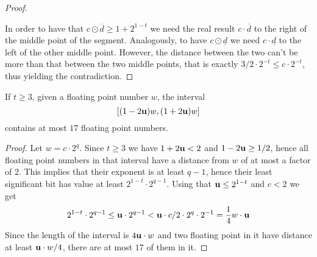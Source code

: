 \begin{proof}
\begin{center}
	\end{center}
	In order to have that $c \odot \overline{d} \ge 1 + 2^{1-t}$ we need the real result $c \cdot \overline{d}$ to the right of the middle point of the segment. Analogously, to have $c \odot \underline{d}$ we need $c \cdot \underline{d}$ to the left of the other middle point. However, the distance between the two can't be more than that between the two middle points, that is exactly $3/2 \cdot 2^{-t} \le c \cdot 2^{-t}$, thus yielding the contradiction.
\end{proof}

\begin{prop}\label{appA:th:interval-number-elem}
	If $t \ge 3$, given a floating point number $w$, the interval
	\[
	\left[ (1 - 2 \textbf{u}) w, (1 + 2 \textbf{u}) w \right]
	\]
	contains at most $17$ floating point numbers.
\end{prop}
\begin{proof}
	Let $w = c \cdot 2^q$. Since $t \ge 3$ we have $1 + 2 \textbf{u} < 2$ and $1 - 2 \textbf{u} \ge 1/2$, hence all floating point numbers in that interval have a distance from $w$ of at most a factor of $2$. This implies that their exponent is at least $q - 1$, hence their least significant bit has value at least $2^{1-t} \cdot 2^{q-1}$. Using that $\textbf{u} \le 2^{1-t}$ and $c < 2$ we get
	\[
	2^{1-t} \cdot 2^{q-1} \le \textbf{u} \cdot 2^{q-1} < \textbf{u} \cdot c / 2 \cdot 2^{q} \cdot 2^{-1} = \frac{1}{4} w \cdot \textbf{u}
	\]
	Since the length of the interval is $4\textbf{u} \cdot w$ and two floating point in it have distance at least $\textbf{u} \cdot w /4$, there are at most $17$ of them in it.
\end{proof}